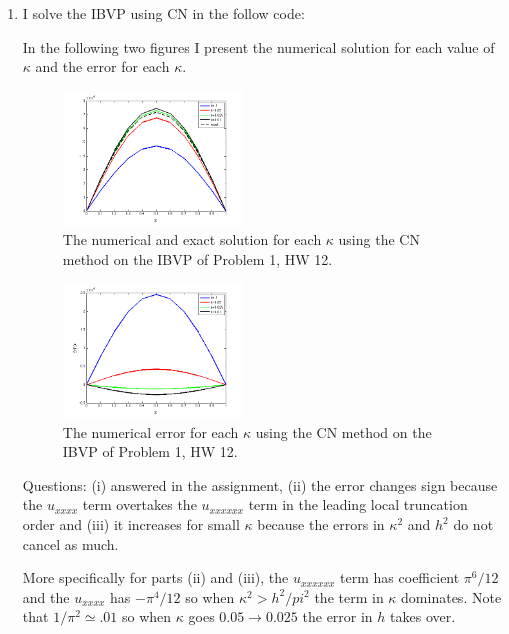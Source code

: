 \documentclass[11pt]{article}
\begin{document}
\begin{enumerate}
\item I solve the IBVP using CN in the follow code:



In the following two figures I present the numerical solution for each value of $\kappa$ and the error for each $\kappa$.

\begin{figure}[h!]
  \centering
    \includegraphics[width=0.45\textwidth]{andy_hw13_prb04_02.png}
  \caption{The numerical and exact solution for each $\kappa$ using the CN method on the IBVP of Problem 1, HW 12.}
\end{figure}

\begin{figure}[h!]
  \centering
    \includegraphics[width=0.45\textwidth]{andy_hw13_prb04_03.png}
  \caption{The numerical error for each $\kappa$ using the CN method on the IBVP of Problem 1, HW 12.}
\end{figure}

Questions: (i) answered in the assignment, (ii) the error changes sign because the $u_{xxxx}$ term overtakes the $u_{xxxxxx}$ term in the leading local truncation order and (iii) it increases for small $\kappa$ because the errors in $\kappa^2$ and $h^2$ do not cancel as much.

More specifically for parts (ii) and (iii), the $u_{xxxxxx}$ term has coefficient $\pi^6/12$ and the $u_{xxxx}$ has $-\pi^4/12$ so when $\kappa ^2 > h^2/pi^2$ the term in $\kappa$ dominates. Note that $1/\pi^2 \simeq .01$ so when $\kappa$ goes $0.05\to 0.025$ the error in $h$ takes over.


\end{enumerate}
\end{document}
